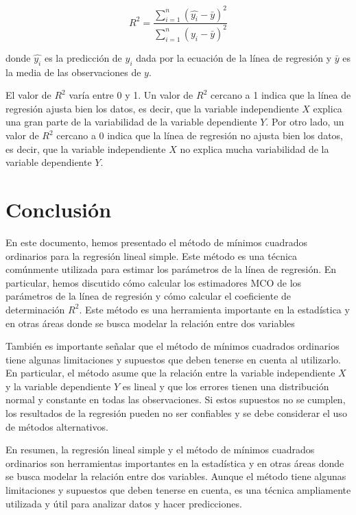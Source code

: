 \documentclass{article}
\begin{document}
\begin{equation}
R^2 = \frac{\sum_{i=1}^n (\hat{y_i} - \bar{y})^2}{\sum_{i=1}^n (y_i - \bar{y})^2}
\end{equation}

donde $\hat{y_i}$ es la predicción de $y_i$ dada por la ecuación de la línea de regresión y $\bar{y}$ es la media de las observaciones de $y$.

El valor de $R^2$ varía entre 0 y 1. Un valor de $R^2$ cercano a 1 indica que la línea de regresión ajusta bien los datos, es decir, que la variable independiente $X$ explica una gran parte de la variabilidad de la variable dependiente $Y$. Por otro lado, un valor de $R^2$ cercano a 0 indica que la línea de regresión no ajusta bien los datos, es decir, que la variable independiente $X$ no explica mucha variabilidad de la variable dependiente $Y$.

\section{Conclusión}

En este documento, hemos presentado el método de mínimos cuadrados ordinarios para la regresión lineal simple. Este método es una técnica comúnmente utilizada para estimar los parámetros de la línea de regresión. En particular, hemos discutido cómo calcular los estimadores MCO de los parámetros de la línea de regresión y cómo calcular el coeficiente de determinación $R^2$. Este método es una herramienta importante en la estadística y en otras áreas donde se busca modelar la relación entre dos variables

También es importante señalar que el método de mínimos cuadrados ordinarios tiene algunas limitaciones y supuestos que deben tenerse en cuenta al utilizarlo. En particular, el método asume que la relación entre la variable independiente $X$ y la variable dependiente $Y$ es lineal y que los errores tienen una distribución normal y constante en todas las observaciones. Si estos supuestos no se cumplen, los resultados de la regresión pueden no ser confiables y se debe considerar el uso de métodos alternativos.

En resumen, la regresión lineal simple y el método de mínimos cuadrados ordinarios son herramientas importantes en la estadística y en otras áreas donde se busca modelar la relación entre dos variables. Aunque el método tiene algunas limitaciones y supuestos que deben tenerse en cuenta, es una técnica ampliamente utilizada y útil para analizar datos y hacer predicciones.
\end{document}
